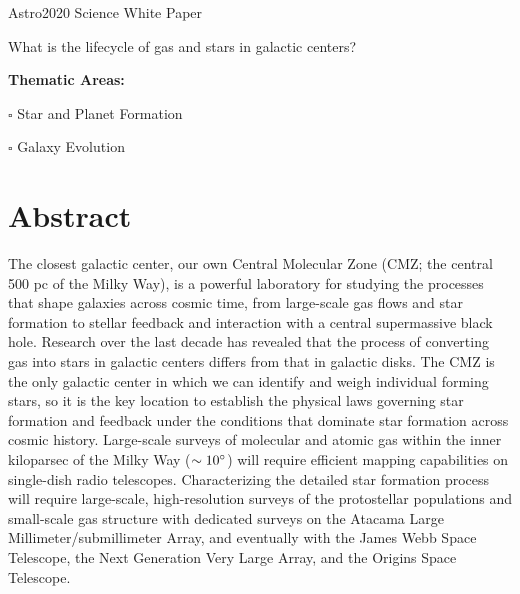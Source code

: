 \documentclass[modern]{aastex62}
\begin{document}
{\center
\huge
Astro2020 Science White Paper \linebreak

What is the lifecycle of gas and stars in galactic centers? 
\vspace{5mm}
}

{
\noindent \textbf{Thematic Areas:}

\noindent $\square$ Star and Planet Formation 

\noindent $\square$ Galaxy Evolution  
}
% 
%  

\vspace{5mm}
\author{Adam Ginsburg}
\author{Elisabeth A.~C.~Mills}
\author{Cara D.~Battersby}
\author{Steven N.~Longmore}
\author{J.~M.~Diederik Kruijssen}


\section*{}



\vspace{-1.5cm}


\section*{Abstract}
The closest galactic center, our own Central Molecular Zone (CMZ; the
central 500 pc of the Milky Way), is a powerful laboratory for studying the
processes that shape galaxies across cosmic time, from large-scale gas flows
and star formation to stellar feedback and interaction with a central
supermassive black hole. Research over the last decade has revealed that the
process of converting gas into stars in galactic centers differs from 
that in galactic disks. The CMZ is the only galactic center in which
we can identify and weigh individual forming stars, so it is the key location
to establish the physical laws governing star formation and feedback under the
conditions that dominate star formation across cosmic history. Large-scale surveys
of molecular and atomic gas within the inner kiloparsec of the Milky Way
($\sim10^{\circ}$) will require efficient mapping capabilities on single-dish
radio telescopes. Characterizing the detailed star formation process will
require large-scale, high-resolution surveys of the protostellar populations
and small-scale gas structure with dedicated surveys on the Atacama Large
Millimeter/submillimeter Array, and eventually with the James Webb Space
Telescope, the Next Generation Very Large Array, and the Origins Space
Telescope.
\vspace{5mm}
\end{document}
